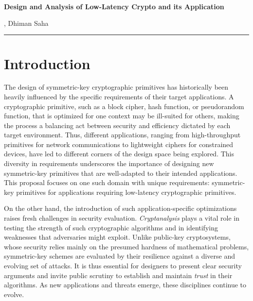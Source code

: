 
\newcommand{\soptitle}{Design and Analysis of Low-Latency Crypto and its Application}

\begin{center}
\vspace*{-0.8cm}
{\sffamily\bfseries\Large \textcolor{theme}{\soptitle}}\par
\vspace{2pt}
{\small \yourname, Dhiman Saha}
\vspace{8pt}
\hrule
\end{center}

\section{Introduction}
The design of symmetric-key cryptographic primitives has historically been heavily influenced by the specific requirements of their target applications.
A cryptographic primitive, such as a block cipher, hash function, or pseudorandom function, that is optimized for one context may be ill-suited for others, making the process a balancing act between security and efficiency dictated by each target environment.
Thus, different applications, ranging from high-throughput primitives for network communications to lightweight ciphers for constrained devices, have led to different corners of the design space being explored.
This diversity in requirements underscores the importance of designing new symmetric-key primitives that are well-adapted to their intended applications.
This proposal focuses on one such domain with unique requirements: symmetric-key primitives for applications requiring low-latency cryptographic primitives.

On the other hand, the introduction of such application-specific optimizations raises fresh challenges in security evaluation.
\emph{Cryptanalysis} plays a vital role in testing the strength of such cryptographic algorithms and in identifying weaknesses that adversaries might exploit.
Unlike public-key cryptosystems, whose security relies mainly on the presumed hardness of mathematical problems, symmetric-key schemes are evaluated by their resilience against a diverse and evolving set of attacks.
It is thus essential for designers to present clear security arguments and invite public scrutiny to establish and maintain \emph{trust} in their algorithms.
As new applications and threats emerge, these disciplines continue to evolve.

